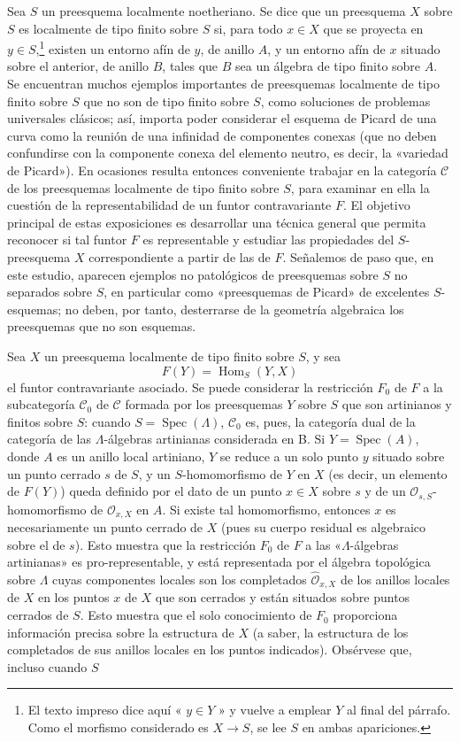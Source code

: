 Sea $S$ un preesquema localmente noetheriano. Se dice que un preesquema $X$
sobre $S$ es localmente de tipo finito sobre $S$ si, para todo
$x\in X$ que se proyecta en $y\in S$,\footnote{El texto impreso dice aquí
« $y\in Y$ » y vuelve a emplear $Y$ al final del párrafo. Como el morfismo
considerado es $X\longrightarrow S$, se lee $S$ en ambas apariciones.} existen
un entorno afín de $y$, de anillo $A$, y un entorno afín de $x$ situado sobre
el anterior, de anillo $B$, tales que $B$ sea un álgebra de tipo finito sobre
$A$. Se encuentran muchos ejemplos importantes de preesquemas localmente de
tipo finito sobre $S$ que no son de tipo finito sobre $S$, como soluciones de
problemas universales clásicos; así, importa poder considerar el esquema de
Picard de una curva como la reunión de una infinidad de componentes conexas
(que no deben confundirse con la componente conexa del elemento neutro, es
decir, la «variedad de Picard»). En ocasiones resulta entonces conveniente
trabajar en la categoría $\mathcal C$ de los preesquemas localmente de tipo
finito sobre $S$, para examinar en ella la cuestión de la representabilidad de
un funtor contravariante $F$. El objetivo principal de estas exposiciones es
desarrollar una técnica general que permita reconocer si tal funtor $F$ es
representable y estudiar las propiedades del $S$-preesquema $X$ correspondiente
a partir de las de $F$. Señalemos de paso que, en este estudio, aparecen
ejemplos no patológicos de preesquemas sobre $S$ no separados sobre $S$, en
particular como «preesquemas de Picard» de excelentes $S$-esquemas; no deben,
por tanto, desterrarse de la geometría algebraica los preesquemas que no son
esquemas.

Sea $X$ un preesquema localmente de tipo finito sobre $S$, y sea
\[
  F(Y)=\operatorname{Hom}_S(Y,X)
\]
el funtor contravariante asociado. Se puede considerar la restricción $F_0$ de
$F$ a la subcategoría $\mathcal C_0$ de $\mathcal C$ formada por los
preesquemas $Y$ sobre $S$ que son artinianos y finitos sobre $S$: cuando
$S=\operatorname{Spec}(\Lambda)$, $\mathcal C_0$ es, pues, la categoría dual
de la categoría de las $\Lambda$-álgebras artinianas considerada en B. Si
$Y=\operatorname{Spec}(A)$, donde $A$ es un anillo local artiniano, $Y$ se
reduce a un solo punto $y$ situado sobre un punto cerrado $s$ de $S$, y un
$S$-homomorfismo de $Y$ en $X$ (es decir, un elemento de $F(Y)$) queda definido
por el dato de un punto $x\in X$ sobre $s$ y de un
$\mathcal O_{s,S}$-homomorfismo de $\mathcal O_{x,X}$ en $A$. Si existe tal
homomorfismo, entonces $x$ es necesariamente un punto cerrado de $X$ (pues su
cuerpo residual es algebraico sobre el de $s$). Esto muestra que la restricción
$F_0$ de $F$ a las «$\Lambda$-álgebras artinianas» es pro-representable, y está
representada por el álgebra topológica sobre $\Lambda$ cuyas componentes
locales son los completados $\widehat{\mathcal O}_{x,X}$ de los anillos locales
de $X$ en los puntos $x$ de $X$ que son cerrados y están situados sobre puntos
cerrados de $S$. Esto muestra que el solo conocimiento de $F_0$ proporciona
información precisa sobre la estructura de $X$ (a saber, la estructura de los
completados de sus anillos locales en los puntos indicados). Obsérvese que,
incluso cuando $S$

